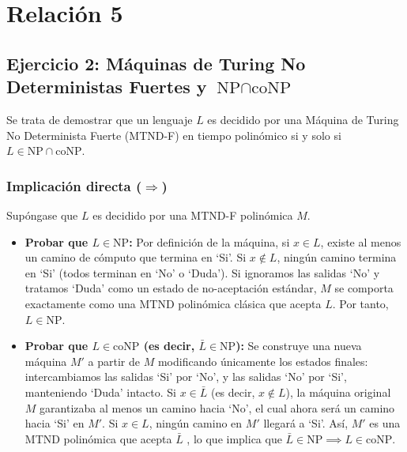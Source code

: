 \documentclass[12pt]{book} %
\begin{document}
\hypertarget{relaciuxf3n-5}{%
\section{Relación 5}\label{relaciuxf3n-5}}

\hypertarget{ejercicio-2-muxe1quinas-de-turing-no-deterministas-fuertes-y-textnp-cap-textconp}{%
\subsection{\texorpdfstring{Ejercicio 2: Máquinas de Turing No
Deterministas Fuertes y
\(\text{NP} \cap \text{coNP}\)}{Ejercicio 2: Máquinas de Turing No Deterministas Fuertes y \textbackslash text\{NP\} \textbackslash cap \textbackslash text\{coNP\}}}\label{ejercicio-2-muxe1quinas-de-turing-no-deterministas-fuertes-y-textnp-cap-textconp}}

Se trata de demostrar que un lenguaje \(L\) es decidido por una Máquina
de Turing No Determinista Fuerte (MTND-F) en tiempo polinómico si y solo
si \(L \in \text{NP} \cap \text{coNP}\).

\hypertarget{implicaciuxf3n-directa-rightarrow}{%
\subsubsection{\texorpdfstring{Implicación directa
(\(\Rightarrow\))}{Implicación directa (\textbackslash Rightarrow)}}\label{implicaciuxf3n-directa-rightarrow}}

Supóngase que \(L\) es decidido por una MTND-F polinómica \(M\).

\begin{itemize}
\item
  \textbf{Probar que \(L \in \text{NP}\):} Por definición de la máquina,
  si \(x \in L\), existe al menos un camino de cómputo que termina en
  `Si'. Si \(x \notin L\), ningún camino termina en `Si' (todos terminan
  en `No' o `Duda'). Si ignoramos las salidas `No' y tratamos `Duda'
  como un estado de no-aceptación estándar, \(M\) se comporta
  exactamente como una MTND polinómica clásica que acepta \(L\). Por
  tanto, \(L \in \text{NP}\).
\item
  \textbf{Probar que \(L \in \text{coNP}\) (es decir,
  \(\bar{L} \in \text{NP}\)):} Se construye una nueva máquina \(M'\) a
  partir de \(M\) modificando únicamente los estados finales:
  intercambiamos las salidas `Si' por `No', y las salidas `No' por `Si',
  manteniendo `Duda' intacto. Si \(x \in \bar{L}\) (es decir,
  \(x \notin L\)), la máquina original \(M\) garantizaba al menos un
  camino hacia `No', el cual ahora será un camino hacia `Si' en \(M'\).
  Si \(x \in L\), ningún camino en \(M'\) llegará a `Si'. Así, \(M'\) es
  una MTND polinómica que acepta \(\bar{L}\) , lo que implica que
  \(\bar{L} \in \text{NP} \implies L \in \text{coNP}\).
\end{itemize}
\end{document}
